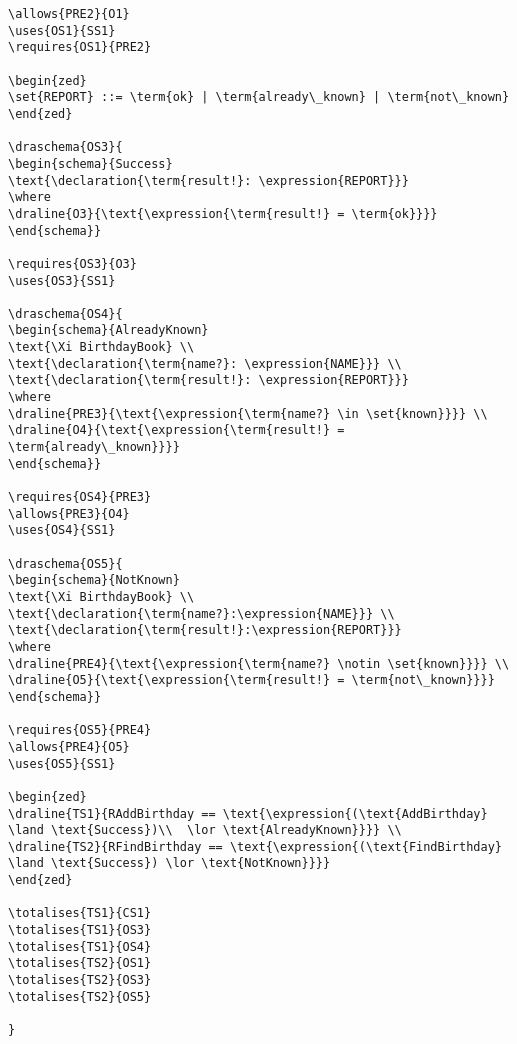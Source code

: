 \begin{verbatim}
\allows{PRE2}{O1}
\uses{OS1}{SS1}
\requires{OS1}{PRE2}

\begin{zed} 
\set{REPORT} ::= \term{ok} | \term{already\_known} | \term{not\_known}
\end{zed}

\draschema{OS3}{
\begin{schema}{Success}
\text{\declaration{\term{result!}: \expression{REPORT}}}
\where
\draline{O3}{\text{\expression{\term{result!} = \term{ok}}}}
\end{schema}}

\requires{OS3}{O3}
\uses{OS3}{SS1}

\draschema{OS4}{
\begin{schema}{AlreadyKnown}
\text{\Xi BirthdayBook} \\
\text{\declaration{\term{name?}: \expression{NAME}}} \\
\text{\declaration{\term{result!}: \expression{REPORT}}}
\where
\draline{PRE3}{\text{\expression{\term{name?} \in \set{known}}}} \\
\draline{O4}{\text{\expression{\term{result!} = \term{already\_known}}}}
\end{schema}}

\requires{OS4}{PRE3}
\allows{PRE3}{O4}
\uses{OS4}{SS1}

\draschema{OS5}{
\begin{schema}{NotKnown}
\text{\Xi BirthdayBook} \\
\text{\declaration{\term{name?}:\expression{NAME}}} \\
\text{\declaration{\term{result!}:\expression{REPORT}}}
\where
\draline{PRE4}{\text{\expression{\term{name?} \notin \set{known}}}} \\
\draline{O5}{\text{\expression{\term{result!} = \term{not\_known}}}}
\end{schema}}

\requires{OS5}{PRE4}
\allows{PRE4}{O5}
\uses{OS5}{SS1}

\begin{zed} 
\draline{TS1}{RAddBirthday == \text{\expression{(\text{AddBirthday} \land \text{Success})\\  \lor \text{AlreadyKnown}}}} \\
\draline{TS2}{RFindBirthday == \text{\expression{(\text{FindBirthday} \land \text{Success}) \lor \text{NotKnown}}}} 
\end{zed}

\totalises{TS1}{CS1}
\totalises{TS1}{OS3}
\totalises{TS1}{OS4}
\totalises{TS2}{OS1}
\totalises{TS2}{OS3}
\totalises{TS2}{OS5}

}

\end{verbatim}
